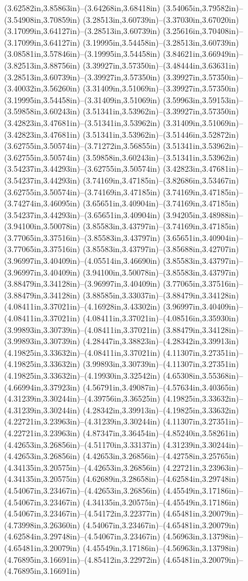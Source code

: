 (3.62582in,3.85863in)--(3.64268in,3.68418in) (3.54065in,3.79582in)--(3.54908in,3.70859in) (3.28513in,3.60739in)--(3.37030in,3.67020in) (3.17099in,3.64127in)--(3.28513in,3.60739in) (3.25616in,3.70408in)--(3.17099in,3.64127in) (3.19995in,3.54458in)--(3.28513in,3.60739in) (3.08581in,3.57846in)--(3.19995in,3.54458in) (3.84621in,3.66949in)--(3.82513in,3.88756in) (3.39927in,3.57350in)--(3.48444in,3.63631in) (3.28513in,3.60739in)--(3.39927in,3.57350in) (3.39927in,3.57350in)--(3.40032in,3.56260in) (3.31409in,3.51069in)--(3.39927in,3.57350in) (3.19995in,3.54458in)--(3.31409in,3.51069in) (3.59963in,3.59153in)--(3.59858in,3.60243in) (3.51341in,3.53962in)--(3.39927in,3.57350in) (3.42823in,3.47681in)--(3.51341in,3.53962in) (3.31409in,3.51069in)--(3.42823in,3.47681in) (3.51341in,3.53962in)--(3.51446in,3.52872in) (3.62755in,3.50574in)--(3.71272in,3.56855in) (3.51341in,3.53962in)--(3.62755in,3.50574in) (3.59858in,3.60243in)--(3.51341in,3.53962in) (3.54237in,3.44293in)--(3.62755in,3.50574in) (3.42823in,3.47681in)--(3.54237in,3.44293in) (3.74169in,3.47185in)--(3.82686in,3.53467in) (3.62755in,3.50574in)--(3.74169in,3.47185in) (3.74169in,3.47185in)--(3.74274in,3.46095in) (3.65651in,3.40904in)--(3.74169in,3.47185in) (3.54237in,3.44293in)--(3.65651in,3.40904in) (3.94205in,3.48988in)--(3.94100in,3.50078in) (3.85583in,3.43797in)--(3.74169in,3.47185in) (3.77065in,3.37516in)--(3.85583in,3.43797in) (3.65651in,3.40904in)--(3.77065in,3.37516in) (3.85583in,3.43797in)--(3.85688in,3.42707in) (3.96997in,3.40409in)--(4.05514in,3.46690in) (3.85583in,3.43797in)--(3.96997in,3.40409in) (3.94100in,3.50078in)--(3.85583in,3.43797in) (3.88479in,3.34128in)--(3.96997in,3.40409in) (3.77065in,3.37516in)--(3.88479in,3.34128in) (3.88585in,3.33037in)--(3.88479in,3.34128in) (4.08411in,3.37021in)--(4.16928in,3.43302in) (3.96997in,3.40409in)--(4.08411in,3.37021in) (4.08411in,3.37021in)--(4.08516in,3.35930in) (3.99893in,3.30739in)--(4.08411in,3.37021in) (3.88479in,3.34128in)--(3.99893in,3.30739in) (4.28447in,3.38823in)--(4.28342in,3.39913in) (4.19825in,3.33632in)--(4.08411in,3.37021in) (4.11307in,3.27351in)--(4.19825in,3.33632in) (3.99893in,3.30739in)--(4.11307in,3.27351in) (4.19825in,3.33632in)--(4.19930in,3.32542in) (4.65308in,3.55368in)--(4.66994in,3.37923in) (4.56791in,3.49087in)--(4.57634in,3.40365in) (4.31239in,3.30244in)--(4.39756in,3.36525in) (4.19825in,3.33632in)--(4.31239in,3.30244in) (4.28342in,3.39913in)--(4.19825in,3.33632in) (4.22721in,3.23963in)--(4.31239in,3.30244in) (4.11307in,3.27351in)--(4.22721in,3.23963in) (4.87347in,3.36454in)--(4.85240in,3.58261in) (4.42653in,3.26856in)--(4.51170in,3.33137in) (4.31239in,3.30244in)--(4.42653in,3.26856in) (4.42653in,3.26856in)--(4.42758in,3.25765in) (4.34135in,3.20575in)--(4.42653in,3.26856in) (4.22721in,3.23963in)--(4.34135in,3.20575in) (4.62689in,3.28658in)--(4.62584in,3.29748in) (4.54067in,3.23467in)--(4.42653in,3.26856in) (4.45549in,3.17186in)--(4.54067in,3.23467in) (4.34135in,3.20575in)--(4.45549in,3.17186in) (4.54067in,3.23467in)--(4.54172in,3.22377in) (4.65481in,3.20079in)--(4.73998in,3.26360in) (4.54067in,3.23467in)--(4.65481in,3.20079in) (4.62584in,3.29748in)--(4.54067in,3.23467in) (4.56963in,3.13798in)--(4.65481in,3.20079in) (4.45549in,3.17186in)--(4.56963in,3.13798in) (4.76895in,3.16691in)--(4.85412in,3.22972in) (4.65481in,3.20079in)--(4.76895in,3.16691in) 
